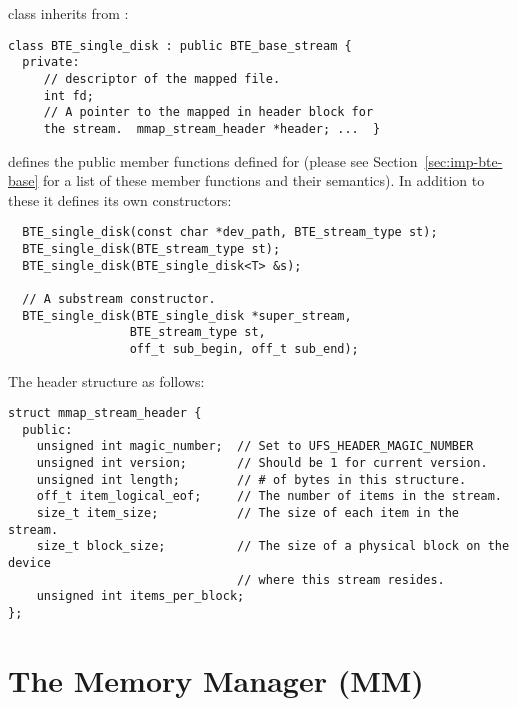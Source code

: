  class inherits from
:
\begin{verbatim}
class BTE_single_disk : public BTE_base_stream { 
  private:
     // descriptor of the mapped file.  
     int fd;
     // A pointer to the mapped in header block for
     the stream.  mmap_stream_header *header; ...  }
\end{verbatim}

 defines the public member
functions defined for  (please see
Section~\ref{sec:imp-bte-base} for a list of these member
functions and their semantics).  In addition to these it
defines its own constructors: 
\begin{verbatim}
  BTE_single_disk(const char *dev_path, BTE_stream_type st); 
  BTE_single_disk(BTE_stream_type st); 
  BTE_single_disk(BTE_single_disk<T> &s); 
  
  // A substream constructor.
  BTE_single_disk(BTE_single_disk *super_stream,
                 BTE_stream_type st,
                 off_t sub_begin, off_t sub_end);
\end{verbatim}
The  header structure as follows:
\begin{verbatim}
struct mmap_stream_header { 
  public:
    unsigned int magic_number;  // Set to UFS_HEADER_MAGIC_NUMBER
    unsigned int version;       // Should be 1 for current version.
    unsigned int length;        // # of bytes in this structure.
    off_t item_logical_eof;     // The number of items in the stream.
    size_t item_size;           // The size of each item in the stream.
    size_t block_size;          // The size of a physical block on the device
                                // where this stream resides.
    unsigned int items_per_block;
};
\end{verbatim}




\section{The Memory Manager (MM)}

